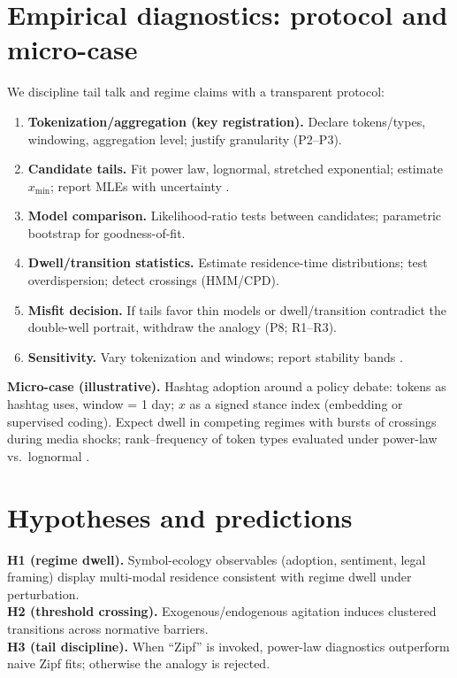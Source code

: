 \documentclass[sn-basic,referee,pdflatex]{sn-jnl}
\begin{document}
\section{Empirical diagnostics: protocol and micro-case}\label{sec:emp}
We discipline tail talk and regime claims with a transparent protocol:
\begin{enumerate}
\item \textbf{Tokenization/aggregation (key registration).} Declare tokens/types, windowing, aggregation level; justify granularity (P2--P3).
\item \textbf{Candidate tails.} Fit power law, lognormal, stretched exponential; estimate \(x_{\min}\); report MLEs with uncertainty \citep{Newman2005,ClausetShaliziNewman2009,Mitzenmacher2004,Simon1955}.
\item \textbf{Model comparison.} Likelihood-ratio tests between candidates; parametric bootstrap for goodness-of-fit.
\item \textbf{Dwell/transition statistics.} Estimate residence-time distributions; test overdispersion; detect crossings (HMM/CPD).
\item \textbf{Misfit decision.} If tails favor thin models or dwell/transition contradict the double-well portrait, withdraw the analogy (P8; R1--R3).
\item \textbf{Sensitivity.} Vary tokenization and windows; report stability bands .
\end{enumerate}
\noindent\textbf{Micro-case (illustrative).} Hashtag adoption around a policy debate: tokens as hashtag uses, window = 1 day; \(x\) as a signed stance index (embedding or supervised coding). Expect dwell in competing regimes with bursts of crossings during media shocks; rank–frequency of token types evaluated under power-law vs.\ lognormal \citep{Zipf1949,Gabaix1999,Axtell2001,BarabasiAlbert1999}.

\section{Hypotheses and predictions}\label{sec:hypotheses}
\textbf{H1 (regime dwell).} Symbol-ecology observables (adoption, sentiment, legal framing) display multi-modal residence consistent with regime dwell under perturbation.\\
\textbf{H2 (threshold crossing).} Exogenous/endogenous agitation induces clustered transitions across normative barriers.\\
\textbf{H3 (tail discipline).} When “Zipf” is invoked, power-law diagnostics outperform naive Zipf fits; otherwise the analogy is rejected.
\end{document}
